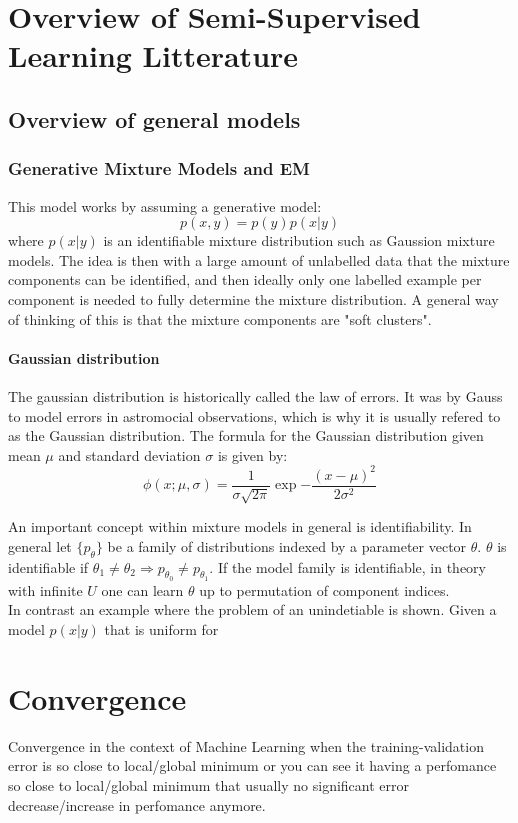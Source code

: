 \documentclass[10pt, letterpaper]{article}
\begin{document}
\section{Overview of Semi-Supervised Learning Litterature}
\subsection{Overview of general models}
\subsubsection{Generative Mixture Models and EM}
This model works by assuming a generative model:
$$
    p(x, y) = p(y)p(x|y)
$$
where $p(x|y)$ is an identifiable mixture distribution such as Gaussion mixture models. The idea is then with a large amount of unlabelled data that the mixture components can be identified, and then ideally only one labelled example per component is needed to fully determine the mixture distribution. A general way of thinking of this is that the mixture components are "soft clusters".



\paragraph{Gaussian distribution}
The gaussian distribution is historically called the law of errors. It was by Gauss to model errors in astromocial observations, which is why it is usually refered to as the Gaussian distribution. The formula for the Gaussian distribution given mean $\mu$ and standard deviation $\sigma$ is given by:
$$
    \phi(x; \mu, \sigma) = \frac{1}{\sigma \sqrt{2 \pi}} \exp{-\frac{(x-\mu)^2}{2\sigma^2}}
$$

An important concept within mixture models in general is identifiability. In general let $\{p_\theta\}$ be a family of distributions indexed by a parameter vector $\theta$. $\theta$ is identifiable if $\theta_1 \neq \theta_2 \Rightarrow p_{\theta_0} \neq p_{\theta_1}$. If the model family is identifiable, in theory with infinite $U$ one can learn $\theta$ up to permutation of component indices.\\
In contrast an example where the problem of an unindetiable is shown. Given a model $p(x|y)$ that is uniform for

\section{Convergence}
Convergence in the context of Machine Learning when the training-validation error is so close to local/global minimum or you can see it having a perfomance so close to local/global minimum that usually no significant error decrease/increase in perfomance anymore.

\newpage
\nocite{*}
\printbibliography[heading=bibintoc,title={Bibliography}]
\end{document}
